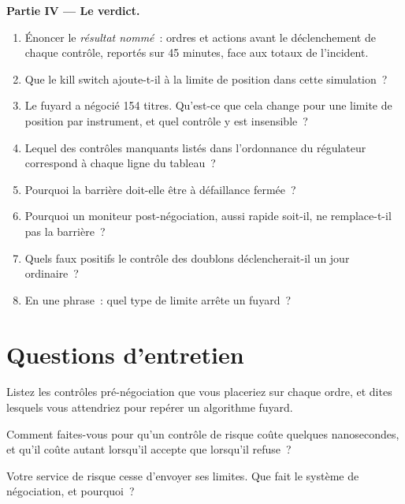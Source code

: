 \begin{problem}
\medskip\noindent\textbf{Partie IV --- Le verdict.}
\begin{enumerate}[resume]
\item Énoncer le \emph{résultat nommé}~: ordres et actions avant le déclenchement de chaque contrôle, reportés sur 45 minutes, face aux
totaux de l'incident.
\item Que le kill switch ajoute-t-il à la limite de position dans cette simulation~?
\item Le fuyard a négocié 154 titres. Qu'est-ce que cela change pour une limite de position par instrument, et quel contrôle y est insensible~?
\item Lequel des contrôles manquants listés dans l'ordonnance du régulateur correspond à chaque ligne du tableau~?
\item Pourquoi la barrière doit-elle être à défaillance fermée~?
\item Pourquoi un moniteur post-négociation, aussi rapide soit-il, ne remplace-t-il pas la barrière~?
\item Quels faux positifs le contrôle des doublons déclencherait-il un jour ordinaire~?
\item En une phrase~: quel type de limite arrête un fuyard~?
\end{enumerate}
\end{problem}

\section{Questions d'entretien}

\begin{interviewq}\label{iq:ll:pre-trade-risk-and-kill-switches:1}
Listez les contrôles pré-négociation que vous placeriez sur chaque ordre, et dites lesquels vous attendriez pour repérer un algorithme fuyard.
\end{interviewq}

\begin{interviewq}\label{iq:ll:pre-trade-risk-and-kill-switches:2}
Comment faites-vous pour qu'un contrôle de risque coûte quelques nanosecondes, et qu'il coûte autant lorsqu'il accepte que lorsqu'il refuse~?
\end{interviewq}

\begin{interviewq}\label{iq:ll:pre-trade-risk-and-kill-switches:3}
Votre service de risque cesse d'envoyer ses limites. Que fait le système de négociation, et pourquoi~?
\end{interviewq}

